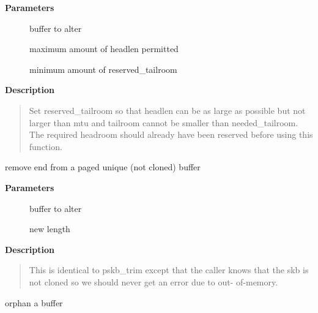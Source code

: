 \documentclass[a4paper,8pt,english]{sphinxmanual}
\begin{document}
\textbf{Parameters}
\begin{description}
\item[{}] \leavevmode
buffer to alter

\item[{}] \leavevmode
maximum amount of headlen permitted

\item[{}] \leavevmode
minimum amount of reserved\_tailroom

\end{description}

\textbf{Description}
\begin{quote}

Set reserved\_tailroom so that headlen can be as large as possible but
not larger than mtu and tailroom cannot be smaller than
needed\_tailroom.
The required headroom should already have been reserved before using
this function.
\end{quote}

\begin{fulllineitems}
\label{networking/kapi:c.pskb_trim_unique}
remove end from a paged unique (not cloned) buffer

\end{fulllineitems}


\textbf{Parameters}
\begin{description}
\item[{}] \leavevmode
buffer to alter

\item[{}] \leavevmode
new length

\end{description}

\textbf{Description}
\begin{quote}

This is identical to pskb\_trim except that the caller knows that
the skb is not cloned so we should never get an error due to out-
of-memory.
\end{quote}

\begin{fulllineitems}
\label{networking/kapi:c.skb_orphan}
orphan a buffer

\end{fulllineitems}
\end{document}
